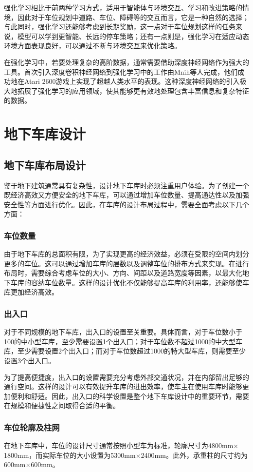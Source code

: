 强化学习相比于前两种学习方式，适用于智能体与环境交互、学习和改进策略的情境，因此对于车位规划中道路、车位、障碍等的交互而言，它是一种自然的选择；与此同时，强化学习还能够考虑到长期奖励，这一点对于车位规划这样的任务来说，模型可以学到更智能、长远的停车策略；还有一点则是，强化学习在适应动态环境方面表现良好，可以通过不断与环境交互来优化策略。

在强化学习中，若要处理复杂的高阶数据\cite{arulkumaran2017deep}，通常需要借助深度神经网络作为强大的工具。首次引入深度卷积神经网络到强化学习中的工作由Mnih等人完成\cite{mnih2013playing}，他们成功地在Atari 2600游戏上实现了超越人类水平的表现。这种深度神经网络的引入极大地拓展了强化学习的应用领域，使其能够更有效地处理包含丰富信息和复杂特征的数据。
\section{地下车库设计}
\subsection{地下车库布局设计}
鉴于地下建筑通常具有复杂性，设计地下车库时必须注重用户体验。为了创建一个既经济高效又方便安全的地下车库，可以通过增加车位数量、提高通达性以及加强安全性等方面进行优化。因此，在车库的设计布局过程中，需要全面考虑以下几个方面：
\subsubsection{车位数量}
由于地下车库的总面积有限，为了实现更高的经济效益，必须在受限的空间内划分更多的车位。这可以通过增加车库的层数\cite{NMKJ201520021}以及调整车位的排布方式来实现。在进行布局时，需要综合考虑车位的大小、方向、间距以及道路宽度等因素，以最大化地下车库的容纳车位数量。这样的设计优化不仅能够提高车库的利用率，还能够使车库更加经济高效。
\subsubsection{出入口}
对于不同规模的地下车库，出入口的设置至关重要。具体而言，对于车位数小于100的中小型车库，至少需要设置1个出入口；对于车位数不超过1000的中大型车库，至少需要设置2个出入口；而对于车位数超过1000的特大型车库，则需要至少设置3个出入口\cite{CZJS202301011}。

为了提高便捷度，出入口的设置需要充分考虑外部交通状况，并在内部留出足够的通行空间。这样的设计可以有效提升车库的进出效率，使车主在使用车库时能够更加便利和舒适。因此，出入口的科学设置是整个地下车库设计中的重要环节，需要在规模和便捷性之间取得合适的平衡。
\subsubsection{车位轮廓及柱网}
在地下车库中，车位的设计尺寸通常按照小型车为标准，轮廓尺寸为4800mm$\times$1800mm，而实际车位的大小设置为5300mm$\times$2400mm\cite{SCSA201905095, FJJC201712012, CZJS202301011, SCSA202308036}。此外，承重柱的尺寸约为600mm$\times$600mm\cite{FJJC201712012}。

